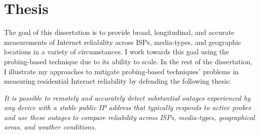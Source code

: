 




\section{Thesis}



The goal of this dissertation is to provide broad, longitudinal, and accurate measurements of
Internet reliability across ISPs, media-types, and geographic
locations in a variety of circumstances. I work towards this goal using the
probing-based technique due to its ability to scale. In the rest of
the dissertation, I illustrate my approaches to mitigate probing-based
techniques' problems in measuring residential Internet reliability
by defending the following thesis:

\emph{It is possible to remotely and accurately detect substantial outages
  experienced by any device with a stable public IP address that typically
  responds to active probes and use these outages to compare
  reliability across ISPs, media-types, geographical areas, and
  weather conditions.} 

